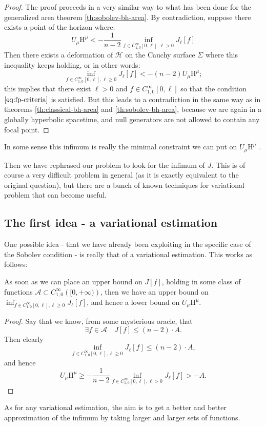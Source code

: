 \begin{proof}
	The proof proceeds in a very similar way to what has been done for the generalized area theorem \ref{th:sobolev-bh-area}. By contradiction, suppose there exists a point of the horizon where:
	\[
		U_{\mu}\mathrm{H}^{\mu} < -\frac{1}{n - 2} \inf_{f\in C^{\infty}_{1,0}[0, \ell], \ell > 0}J_{\ell}[f]	
	\]
	Then there exists a deformation of \(\mathscr{H}\) on the Cauchy surface \(\Sigma\) where this inequality keeps holding, or in other words:
	\[
	\inf_{f\in C^{\infty}_{1,0}[0, \ell], \ell \ge 0}J_{\ell}[f] < - (n - 2)U_{\mu}\mathrm{H}^{\mu};
	\]
	this implies that there exist \(\ell > 0\) and \(f\in C^{\infty}_{1,0}[0, \ell]\) so that the condition \(\eqref{eq:fp-criteria}\) is satisfied. But this leads to a contradiction in the same way as in theorems \ref{th:classical-bh-area} and \ref{th:sobolev-bh-area}, because we are again in a globally hyperbolic spacetime, and null generators are not allowed to contain any focal point.
\end{proof}

In some sense this infimum is really the minimal constraint we can put on \(U_{\mu}\mathrm{H}^{\mu}\)
.

Then we have rephrased our problem to look for the infimum of \(J\).
This is of course a very difficult problem in general (as it is exactly equivalent to the original question), but there are a bunch of known techniques for variational problem that can become useful.

\subsection{The first idea - a variational estimation}
One possible idea - that we have already been exploiting in the specific case of the Sobolev condition - is really that of a variational estimation. This works as follows:
\begin{lemma}
	As soon as we can place an upper bound on \(J[f]\), holding in some class of functions \(\mathcal{A} \subset C^{\infty}_{1,0}\left([0,+\infty)\right)\), then we have an upper bound on \(\inf_{f\in C^{\infty}_{1,0}[0, \ell], \ell \ge 0}J_{\ell}[f]\), and hence a lower bound on \(U_{\mu}\mathrm{H}^{\mu}\).
\end{lemma}
	\begin{proof}
		Say that we know, from some mysterious oracle, that
		\[
		\exists f \in \mathcal{A} \quad J[f] \le (n-2) \cdot A.
		\]
		Then clearly
		\[
			\inf_{f\in C^{\infty}_{1,0}[0, \ell], \ell \ge 0}J_{\ell}[f] \le (n-2) \cdot A,
		\]
		and hence
		\[
			U_{\mu}\mathrm{H}^{\mu} \ge -\frac{1}{n - 2} \inf_{f\in C^{\infty}_{1,0}[0, \ell], \ell > 0}J_{\ell}[f] > - A.
		\]
	\end{proof}
	As for any variational estimation, the aim is to get a better and better approximation of the infimum by taking larger and larger sets of functions.


